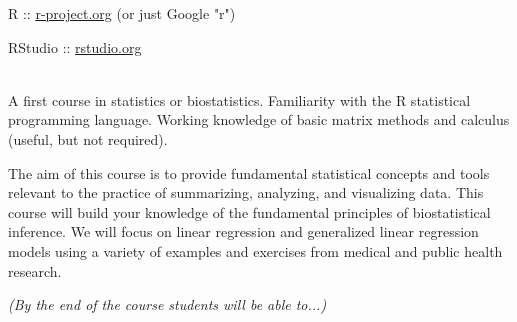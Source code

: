 \documentclass[10pt]{article}
\begin{document}


R :: \href{http://www.r-project.org}{r-project.org} (or just Google "r")

RStudio :: \href{http://www.rstudio.org}{rstudio.org}


\bigskip
{}\\
A first course in statistics or biostatistics. Familiarity with the R statistical programming language. Working knowledge of basic matrix methods and calculus (useful, but not required). 




\bigskip
{}

 The aim of this course is to provide fundamental statistical concepts and tools relevant to the practice of summarizing, analyzing, and visualizing data. This course will build your knowledge of the fundamental principles of biostatistical inference.  We will focus on linear regression and generalized linear regression models using a variety of examples and exercises from medical and public health research. %


\bigskip
{} {\em (By the end of the course students will be able to...)}
\end{document}
